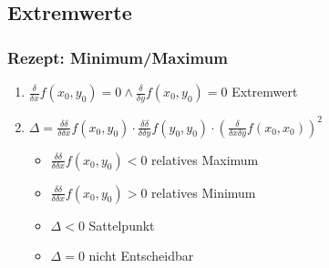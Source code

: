 \subsection{Extremwerte}
\subsubsection{Rezept: Minimum/Maximum}
\begin{enumerate}
	\item $\frac{\delta}{\delta x}f(x_0,y_0) = 0 \wedge \frac{\delta}{\delta y}f(x_0,y_0) = 0$ Extremwert

	\item $\Delta = \frac{\delta \delta}{\delta \delta x}f(x_0,y_0) \cdot \frac{\delta \delta}{\delta \delta y}f(y_0,y_0) \cdot (\frac{\delta}{\delta x \delta y}f(x_0,x_0))^2$
	\begin{itemize}
		\item $\frac{\delta \delta}{\delta \delta x}f(x_0,y_0) < 0$ relatives Maximum
		\item $\frac{\delta \delta}{\delta \delta x}f(x_0,y_0) > 0$ relatives Minimum
		\item $\Delta < 0$ Sattelpunkt
		\item $\Delta = 0$ nicht Entscheidbar
	\end{itemize}
\end{enumerate}
